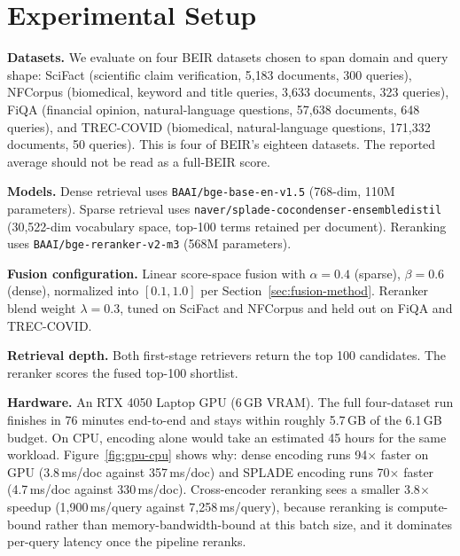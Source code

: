 \documentclass[11pt]{article}
\begin{document}
\section{Experimental Setup}
\label{sec:setup}

\textbf{Datasets.} We evaluate on four BEIR datasets chosen to span domain and query shape: SciFact (scientific claim verification, 5{,}183 documents, 300 queries), NFCorpus (biomedical, keyword and title queries, 3{,}633 documents, 323 queries), FiQA (financial opinion, natural-language questions, 57{,}638 documents, 648 queries), and TREC-COVID (biomedical, natural-language questions, 171{,}332 documents, 50 queries). This is four of BEIR's eighteen datasets. The reported average should not be read as a full-BEIR score.

\textbf{Models.} Dense retrieval uses \texttt{BAAI/bge-base-en-v1.5} (768-dim, 110M parameters). Sparse retrieval uses \texttt{naver/splade-cocondenser-ensembledistil} (30{,}522-dim vocabulary space, top-100 terms retained per document). Reranking uses \texttt{BAAI/bge-reranker-v2-m3} (568M parameters).

\textbf{Fusion configuration.} Linear score-space fusion with $\alpha=0.4$ (sparse), $\beta=0.6$ (dense), normalized into $[0.1, 1.0]$ per Section~\ref{sec:fusion-method}. Reranker blend weight $\lambda=0.3$, tuned on SciFact and NFCorpus and held out on FiQA and TREC-COVID.

\textbf{Retrieval depth.} Both first-stage retrievers return the top 100 candidates. The reranker scores the fused top-100 shortlist.

\textbf{Hardware.} An RTX 4050 Laptop GPU (6\,GB VRAM). The full four-dataset run finishes in 76 minutes end-to-end and stays within roughly 5.7\,GB of the 6.1\,GB budget. On CPU, encoding alone would take an estimated 45 hours for the same workload. Figure~\ref{fig:gpu-cpu} shows why: dense encoding runs 94$\times$ faster on GPU (3.8\,ms/doc against 357\,ms/doc) and SPLADE encoding runs 70$\times$ faster (4.7\,ms/doc against 330\,ms/doc). Cross-encoder reranking sees a smaller 3.8$\times$ speedup (1{,}900\,ms/query against 7{,}258\,ms/query), because reranking is compute-bound rather than memory-bandwidth-bound at this batch size, and it dominates per-query latency once the pipeline reranks.
\end{document}
